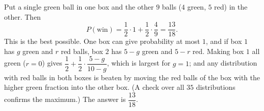 Put a single green ball in one box and the other $9$ balls ($4$ green, $5$ red) in the other. Then
\[
P(\text{win})=\dfrac{1}{2}\cdot1+\dfrac{1}{2}\cdot\dfrac{4}{9}=\dfrac{13}{18}.
\]
This is the best possible. One box can give probability at most $1$, and if box $1$ has $g$ green and $r$ red balls, box $2$ has $5-g$ green and $5-r$ red. Making box $1$ all green ($r=0$) gives $\dfrac{1}{2}+\dfrac{1}{2}\cdot\dfrac{5-g}{10-g}$, which is largest for $g=1$; and any distribution with red balls in both boxes is beaten by moving the red balls of the box with the higher green fraction into the other box. (A check over all $35$ distributions confirms the maximum.) The answer is $\boxed{\dfrac{13}{18}}$.

